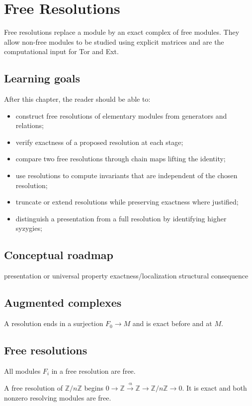 \chapter{Free Resolutions}
\label{ch:v23}

Free resolutions replace a module by an exact complex of free modules. They allow non-free modules to be studied using explicit matrices and are the computational input for Tor and Ext.

\section*{Learning goals}
After this chapter, the reader should be able to:
\begin{itemize}
\item construct free resolutions of elementary modules from generators and relations;
\item verify exactness of a proposed resolution at each stage;
\item compare two free resolutions through chain maps lifting the identity;
\item use resolutions to compute invariants that are independent of the chosen resolution;
\item truncate or extend resolutions while preserving exactness where justified;
\item distinguish a presentation from a full resolution by identifying higher syzygies;
\end{itemize}
\section*{Conceptual roadmap}
\volroadmap
  {presentation or universal property}
  {exactness/localization}
  {structural consequence}

\section{Augmented complexes}
A resolution ends in a surjection $F_0\to M$ and is exact before and at $M$.

\section{Free resolutions}
All modules $F_i$ in a free resolution are free.

\begin{example}\label{ex:v23-expand-01}
A free resolution of $\mathbb Z/n\mathbb Z$ begins $0\to\mathbb Z\xrightarrow{\cdot n}\mathbb Z\to\mathbb Z/n\mathbb Z\to0$. It is exact and both nonzero resolving modules are free.
\end{example}
